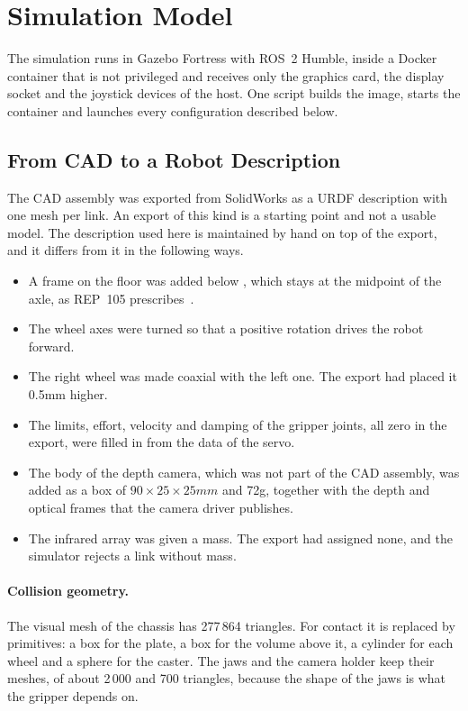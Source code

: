 \section{Simulation Model}
\label{sec:simulation}

The simulation runs in Gazebo Fortress with ROS~2 Humble, inside a Docker container that is
not privileged and receives only the graphics card, the display socket and the joystick
devices of the host. One script builds the image, starts the container and launches every
configuration described below.

\subsection{From CAD to a Robot Description}
\label{sec:urdf}
The CAD assembly was exported from SolidWorks as a URDF description with one mesh per link.
An export of this kind is a starting point and not a usable model. The description used
here is maintained by hand on top of the export, and it differs from it in the following
ways.
\begin{itemize}
  \item A frame  on the floor was added below , which
        stays at the midpoint of the axle, as REP~105 prescribes~\cite{rep105}.
  \item The wheel axes were turned so that a positive rotation drives the robot forward.
  \item The right wheel was made coaxial with the left one. The export had placed it
        0.5\unit{mm} higher.
  \item The limits, effort, velocity and damping of the gripper joints, all zero in the
        export, were filled in from the data of the servo.
  \item The body of the depth camera, which was not part of the CAD assembly, was added as a
        box of $90\times25\times25\unit{mm}$ and 72\unit{g}, together with the depth and
        optical frames that the camera driver publishes.
  \item The infrared array was given a mass. The export had assigned none, and the simulator
        rejects a link without mass.
\end{itemize}

\paragraph{Collision geometry.} The visual mesh of the chassis has 277\,864 triangles. For
contact it is replaced by primitives: a box for the plate, a box for the volume above it, a
cylinder for each wheel and a sphere for the caster. The jaws and the camera holder keep
their meshes, of about 2\,000 and 700 triangles, because the shape of the jaws is what the
gripper depends on.

